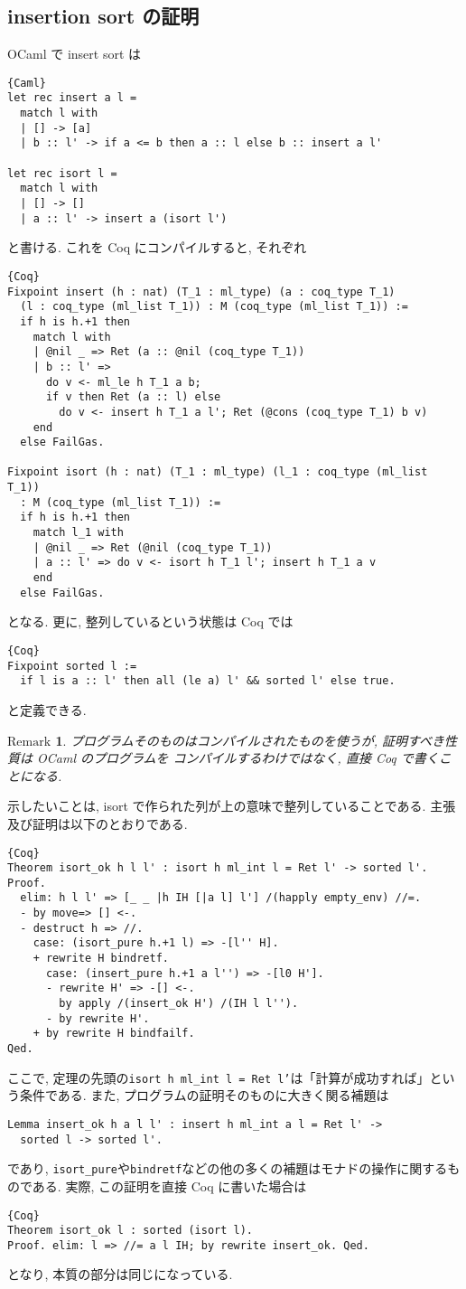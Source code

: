 \documentclass[11pt]{jarticle}
\theoremstyle{mystyle}
\newtheorem{rmk}[df]{$\textrm{Remark}$}
\newcommand{\brmk}{\begin{rmk}}
\newcommand{\ermk}{\end{rmk}}
\newcommand{\0}{\textbf{0}}
\newcommand{\1}{\textbf{1}}
\newcommand{\2}{\textbf{2}}
\begin{document}
\subsection{insertion sort の証明}
OCaml で insert sort は
\begin{lstlisting}{Caml}
let rec insert a l =
  match l with
  | [] -> [a]
  | b :: l' -> if a <= b then a :: l else b :: insert a l'
  
let rec isort l =
  match l with 
  | [] -> []
  | a :: l' -> insert a (isort l')  \end{lstlisting}
と書ける. これを Coq にコンパイルすると, それぞれ
\begin{lstlisting}{Coq}
Fixpoint insert (h : nat) (T_1 : ml_type) (a : coq_type T_1)
  (l : coq_type (ml_list T_1)) : M (coq_type (ml_list T_1)) :=
  if h is h.+1 then
    match l with
    | @nil _ => Ret (a :: @nil (coq_type T_1))
    | b :: l' =>
      do v <- ml_le h T_1 a b;
      if v then Ret (a :: l) else
        do v <- insert h T_1 a l'; Ret (@cons (coq_type T_1) b v)
    end
  else FailGas. 

Fixpoint isort (h : nat) (T_1 : ml_type) (l_1 : coq_type (ml_list T_1))
  : M (coq_type (ml_list T_1)) :=
  if h is h.+1 then
    match l_1 with
    | @nil _ => Ret (@nil (coq_type T_1))
    | a :: l' => do v <- isort h T_1 l'; insert h T_1 a v
    end
  else FailGas.  \end{lstlisting}
となる. 更に, 整列しているという状態は Coq では
\begin{lstlisting}{Coq}
Fixpoint sorted l :=
  if l is a :: l' then all (le a) l' && sorted l' else true.  \end{lstlisting}
と定義できる. 
\brmk
  プログラムそのものはコンパイルされたものを使うが, 証明すべき性質は OCaml のプログラムを
  コンパイルするわけではなく, 直接 Coq で書くことになる. 
\ermk
示したいことは, isort で作られた列が上の意味で整列していることである. 主張及び証明は以下のとおりである. 
\begin{lstlisting}{Coq}
Theorem isort_ok h l l' : isort h ml_int l = Ret l' -> sorted l'.
Proof.
  elim: h l l' => [_ _ |h IH [|a l] l'] /(happly empty_env) //=.
  - by move=> [] <-.
  - destruct h => //.
    case: (isort_pure h.+1 l) => -[l'' H].
    + rewrite H bindretf.
      case: (insert_pure h.+1 a l'') => -[l0 H'].
      - rewrite H' => -[] <-.
        by apply /(insert_ok H') /(IH l l'').
      - by rewrite H'.
    + by rewrite H bindfailf.
Qed.  \end{lstlisting}
ここで, 定理の先頭の{\tt isort h ml\_int l = Ret l'}は「計算が成功すれば」という条件である. 
また, プログラムの証明そのものに大きく関る補題は
\begin{lstlisting}
Lemma insert_ok h a l l' : insert h ml_int a l = Ret l' ->
  sorted l -> sorted l'.  \end{lstlisting}
であり, {\tt isort\_pure}や{\tt bindretf}などの他の多くの補題はモナドの操作に関するものである. 
実際, この証明を直接 Coq に書いた場合は
\begin{lstlisting}{Coq}
Theorem isort_ok l : sorted (isort l).
Proof. elim: l => //= a l IH; by rewrite insert_ok. Qed.  \end{lstlisting}
となり, 本質の部分は同じになっている. 
\end{document}
